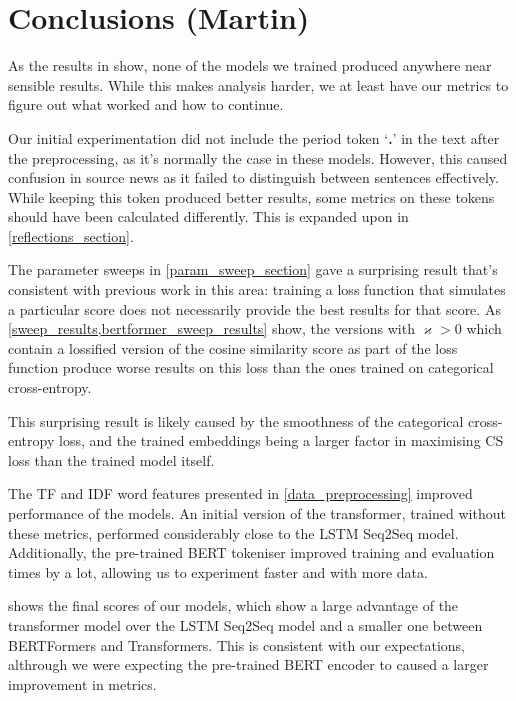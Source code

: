 \section{Conclusions (Martin)}

As the results in \appendixA{} show, none of the models we trained produced anywhere near sensible results.
While this makes analysis harder, we at least have our metrics to figure out what worked and how to continue.

Our initial experimentation did not include the period token `\textbf{.}' in the text after the preprocessing, as it's normally the case in these models.
However, this caused confusion in source news as it failed to distinguish between sentences effectively.
While keeping this token produced better results, some metrics on these tokens should have been calculated differently.
This is expanded upon in \cref{reflections_section}.

The parameter sweeps in \cref{param_sweep_section} gave a surprising result that's consistent with previous work in this area: training a loss function that simulates a particular score does not necessarily provide the best results for that score.
As \cref{sweep_results,bertformer_sweep_results} show, the versions with $\varkappa > 0$ which contain a lossified version of the cosine similarity score as part of the loss function produce worse results on this loss than the ones trained on categorical cross-entropy.

This surprising result is likely caused by the smoothness of the categorical cross-entropy loss, and the trained embeddings being a larger factor in maximising CS loss than the trained model itself.

The TF and IDF word features presented in \cref{data_preprocessing} improved performance of the models.
An initial version of the transformer, trained without these metrics, performed considerably close to the LSTM Seq2Seq model.
Additionally, the pre-trained BERT tokeniser improved training and evaluation times by a lot, allowing us to experiment faster and with more data.

 shows the final scores of our models, which show a large advantage of the transformer model over the LSTM Seq2Seq model and a smaller one between BERTFormers and Transformers.
This is consistent with our expectations, althrough we were expecting the pre-trained BERT encoder to caused a larger improvement in metrics.
